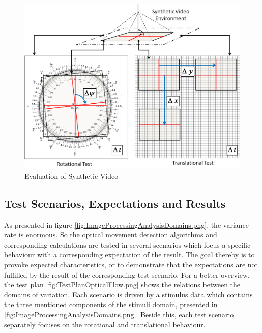 \begin{figure}[H]
	\centering
		\includegraphics[width=1\textwidth]{graphic/SyntheticVideoEvaluation.png}
	\caption{Evaluation of Synthetic Video}
	\label{fig:SyntheticVideoEvaluation.png}
\end{figure}


%
%


\subsection{Test Scenarios, Expectations and Results}
As presented in figure \ref{fig:ImageProcessingAnalysisDomains.png}, the variance rate is enormous. So the optical movement detection algorithms and corresponding calculations are tested in several scenarios which focus a specific behaviour with a corresponding expectation of the result. The goal thereby is to provoke expected characteristics, or to demonstrate that the expectations are not fulfilled by the result of the corresponding test scenario. For a better overview, the test plan \ref{fig:TestPlanOpticalFlow.png} shows the relations between the domains of variation. Each scenario is driven by a stimulus data which contains the three mentioned components of the stimuli domain, presented in 
\ref{fig:ImageProcessingAnalysisDomains.png}. Beside this, each test scenario separately focuses on the rotational and translational behaviour. 

